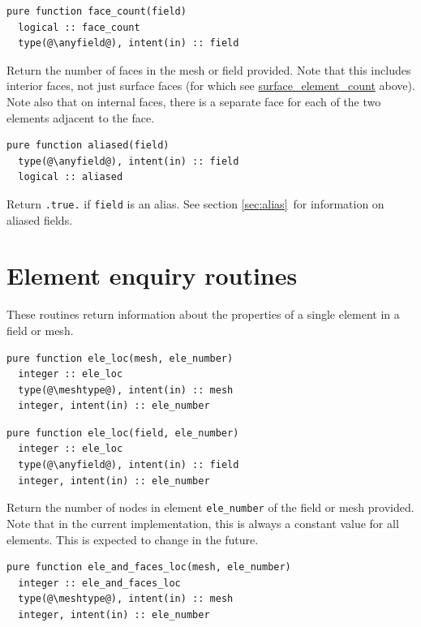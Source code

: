 \documentclass[a4paper, 11pt]{book}
\begin{document}
\begin{lstlisting}
pure function face_count(field)
  logical :: face_count
  type(@\anyfield@), intent(in) :: field
\end{lstlisting}

Return the number of faces in the mesh or field provided. Note that this
includes interior faces, not just surface faces (for which see
\hyperlink{proc:surfaceelementcount}{surface\_element\_count} above). Note
also that on internal faces, there is a separate face for each of the two
elements adjacent to the face.


\begin{lstlisting}
pure function aliased(field)
  type(@\anyfield@), intent(in) :: field
  logical :: aliased
\end{lstlisting}

Return \lstinline+.true.+ if \lstinline+field+ is an alias. See section
\ref{sec:alias}\ for information on aliased fields.


\section{Element enquiry routines}

These routines return information about the properties of a single element
in a field or mesh.


\begin{lstlisting}
pure function ele_loc(mesh, ele_number)
  integer :: ele_loc
  type(@\meshtype@), intent(in) :: mesh
  integer, intent(in) :: ele_number
\end{lstlisting}

\begin{lstlisting}
pure function ele_loc(field, ele_number)
  integer :: ele_loc
  type(@\anyfield@), intent(in) :: field
  integer, intent(in) :: ele_number
\end{lstlisting}

Return the number of nodes in element \lstinline+ele_number+ of the field
or mesh provided. Note that in the current implementation, this is always a
constant value for all elements. This is expected to change in the future.


\begin{lstlisting}
pure function ele_and_faces_loc(mesh, ele_number)
  integer :: ele_and_faces_loc
  type(@\meshtype@), intent(in) :: mesh
  integer, intent(in) :: ele_number
\end{lstlisting}
\end{document}
